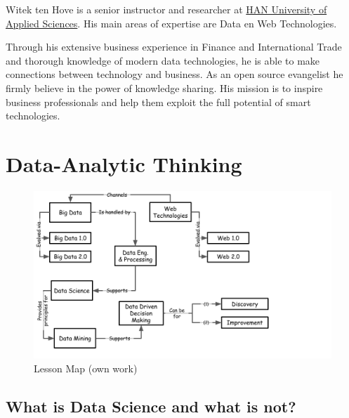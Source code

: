 \documentclass[
]{book}
\begin{document}
Witek ten Hove is a senior instructor and researcher at \href{https://hanuniversity.com/en/}{HAN University of Applied Sciences}. His main areas of expertise are Data en Web Technologies.

Through his extensive business experience in Finance and International Trade and thorough knowledge of modern data technologies, he is able to make connections between technology and business. As an open source evangelist he firmly believe in the power of knowledge sharing. His mission is to inspire business professionals and help them exploit the full potential of smart technologies.

\hypertarget{thinking}{%
\chapter{Data-Analytic Thinking}\label{thinking}}

\begin{figure}

{\centering \includegraphics[width=0.8\linewidth]{images/lesson} 

}

\caption{Lesson Map (own work)}\label{fig:lesson-fig}
\end{figure}

\hypertarget{what-is-data-science-and-what-is-not}{%
\section{What is Data Science and what is not?}\label{what-is-data-science-and-what-is-not}}
\end{document}
